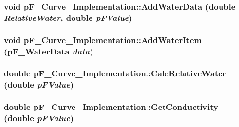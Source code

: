 \label{classp_f___curve___implementation_a574f0de0c3a61c10ad50c2818b824840}
\hypertarget{classp_f___curve___implementation_a6a802dc0367c94d8ff8bb800996ad77a}{
\subsubsection[{AddWaterData}]{\setlength{\rightskip}{0pt plus 5cm}void pF\_\-Curve\_\-Implementation::AddWaterData (double {\em RelativeWater}, \/  double {\em pFValue})}}
\label{classp_f___curve___implementation_a6a802dc0367c94d8ff8bb800996ad77a}
\hypertarget{classp_f___curve___implementation_a40f6e22b2fc11a97d03c8cd78a1ece91}{
\subsubsection[{AddWaterItem}]{\setlength{\rightskip}{0pt plus 5cm}void pF\_\-Curve\_\-Implementation::AddWaterItem ({\bf pF\_\-WaterData} {\em data})}}
\label{classp_f___curve___implementation_a40f6e22b2fc11a97d03c8cd78a1ece91}
\hypertarget{classp_f___curve___implementation_af27422ac8aa7464a5895cab20d44642b}{
\subsubsection[{CalcRelativeWater}]{\setlength{\rightskip}{0pt plus 5cm}double pF\_\-Curve\_\-Implementation::CalcRelativeWater (double {\em pFValue})}}
\label{classp_f___curve___implementation_af27422ac8aa7464a5895cab20d44642b}
\hypertarget{classp_f___curve___implementation_abefa0a2ca31acc282ec9f0ec0d478fa0}{
\subsubsection[{GetConductivity}]{\setlength{\rightskip}{0pt plus 5cm}double pF\_\-Curve\_\-Implementation::GetConductivity (double {\em pFValue})}}
